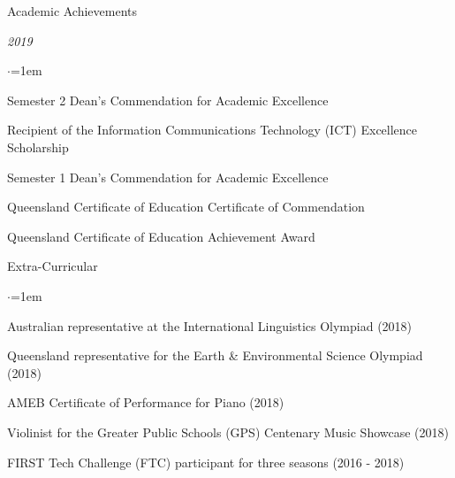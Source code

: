 \documentclass{resume} %
\newcommand{\tab}[1]{\hspace{.2667\textwidth}\rlap{#1}}
\newcommand{\itab}[1]{\hspace{0em}\rlap{#1}}
\begin{document}
\begin{rSection}{Academic Achievements}
\vspace{1em}

\item \textit{2019}
\begin{list}{$\cdot$}{\leftmargin=1em}
    \item Semester 2 Dean's Commendation for Academic Excellence
    \item Recipient of the Information Communications Technology (ICT) Excellence Scholarship
    \item Semester 1 Dean's Commendation for Academic Excellence
    \item Queensland Certificate of Education Certificate of Commendation
    \item Queensland Certificate of Education Achievement Award
\end{list}

\end{rSection}




\vspace{1em}
\begin{rSection}{Extra-Curricular}

\begin{list}{$\cdot$}{\leftmargin=1em}
    \item Australian representative at the International Linguistics Olympiad (2018)
    \item Queensland representative for the Earth \& Environmental Science Olympiad (2018)
    \item AMEB Certificate of Performance for Piano (2018)
    \item Violinist for the Greater Public Schools (GPS) Centenary Music Showcase (2018)
    \item FIRST Tech Challenge (FTC) participant for three seasons (2016 - 2018)
\end{list}

\end{rSection}
\end{document}
